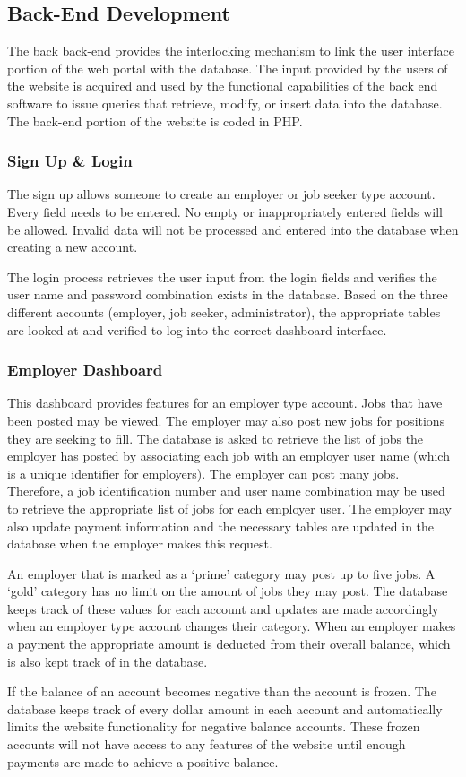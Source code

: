 \documentclass[11pt]{article}
\begin{document}
\subsection{Back-End Development}

The back back-end provides the interlocking mechanism to link the user interface portion of the web portal with the database. The input provided by the users of the website is acquired and used by the functional capabilities of the back end software to issue queries that retrieve, modify, or insert data into the database. The back-end portion of the website is coded in PHP.

\subsubsection{Sign Up \& Login}

The sign up allows someone to create an employer or job seeker type account. Every field needs to be entered. No empty or inappropriately entered fields will be allowed. Invalid data will not be processed and entered into the database when creating a new account. \par
The login process retrieves the user input from the login fields and verifies the user name and password combination exists in the database. Based on the three different accounts (employer, job seeker, administrator), the appropriate tables are looked at and verified to log into the correct dashboard interface.

\subsubsection{Employer Dashboard}

This dashboard provides features for an employer type account. Jobs that have been posted may be viewed. The employer may also post new jobs for positions they are seeking to fill. The database is asked to retrieve the list of jobs the employer has posted by associating each job with an employer user name (which is a unique identifier for employers). The employer can post many jobs. Therefore, a job identification number and user name combination may be used to retrieve the appropriate list of jobs for each employer user. The employer may also update payment information and the necessary tables are updated in the database when the employer makes this request. \par 
	An employer that is marked as a `prime' category may post up to five jobs. A `gold' category has no limit on the amount of jobs they may post. The database keeps track of these values for each account and updates are made accordingly when an employer type account changes their category. When an employer makes a payment the appropriate amount is deducted from their overall balance, which is also kept track of in the database. \par
	If the balance of an account becomes negative than the account is frozen. The database keeps track of every dollar amount in each account and automatically limits the website functionality for negative balance accounts. These frozen accounts will not have access to any features of the website until enough payments are made to achieve a positive balance.	
	
\end{document}
